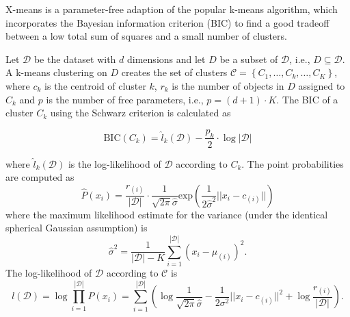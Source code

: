 \documentclass[
  oneside]{book}
\begin{document}
X-means \autocite{Pelleg:xmeans2000} is a parameter-free adaption of the popular k-means algorithm, which incorporates the Bayesian information criterion \autocite{Schwarz:BIC1978} (BIC) to find a good tradeoff between a low total sum of squares and a small number of clusters.

Let \(\mathcal{D}\) be the dataset with \(d\) dimensions and let \(D\) be a subset of \(\mathcal{D}\), i.e., \(D\subseteq \mathcal{D}\).
A k-means clustering on \(D\) creates the set of clusters
\(\mathcal{C}=\left\{C_1,\ldots,C_k,\ldots,C_K\right\}\), where \(c_k\) is the centroid of cluster \(k\), \(r_k\) is the number of objects in \(D\) assigned to \(C_k\) and \(p\) is the number of free parameters, i.e., \(p = (d+1) \cdot K\).
The BIC of a cluster \(C_k\) using the Schwarz criterion is calculated as

\begin{equation}
\text{BIC}(C_k) = \hat{l}_k(\mathcal{D}) - \frac{p_k}{2} \cdot \log |\mathcal{D}| 
\label{eq:05-bic}
\end{equation}

where \(\hat{l}_k(\mathcal{D})\) is the log-likelihood of \(\mathcal{D}\) according to \(C_k\).
The point probabilities are computed as
\begin{equation}
\hat{P}(x_i)=\frac{r_{(i)}}{|\mathcal{D}|}\cdot \frac{1}{\sqrt{2\pi}\hat{\sigma}}\text{exp}\left(\frac{1}{2\hat{\sigma}^2}||x_i-c_{(i)}||\right)
\label{eq:05-point-probs}
\end{equation}
where the maximum likelihood estimate for the variance (under the identical spherical Gaussian assumption) is
\begin{equation}
\hat{\sigma}^2=\frac{1}{|\mathcal{D}|-K}\sum_{i=1}^{|\mathcal{D}|}\left(x_i - \mu_{(i)}\right)^2.
\label{eq:05-mle}
\end{equation}
The log-likelihood of \(\mathcal{D}\) according to \(\mathcal{C}\) is
\begin{equation}
l(\mathcal{D})=\log\prod_{i=1}^{|\mathcal{D}|} P(x_i)=\sum_{i=1}^{|\mathcal{D}|}\left(\log \frac{1}{\sqrt{2\pi}\hat{\sigma}} - \frac{1}{2 \sigma^2} ||x_i-c_{(i)}||^2 + \log \frac{r_{(i)}}{|\mathcal{D}|}  \right).
\label{eq:05-log-likelihood}
\end{equation}
\end{document}
